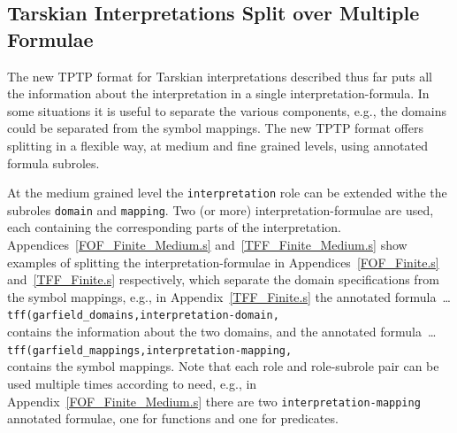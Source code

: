 \documentclass{easychair}
\newcommand{\smalltt}[1]{\small \texttt{#1}}
\begin{document}
\subsection{Tarskian Interpretations Split over Multiple Formulae}
\label{NewTarskianSplit}

The new TPTP format for Tarskian interpretations described thus far puts all the information 
about the interpretation in a single interpretation-formula.
In some situations it is useful to separate the various components, e.g., the domains could be
separated from the symbol mappings.
The new TPTP format offers splitting in a flexible way, at medium and fine grained levels, using 
annotated formula subroles.

At the medium grained level the {\tt interpretation} role can be extended withe the subroles
{\tt domain} and {\tt mapping}.
Two (or more) interpretation-formulae are used, each containing the corresponding parts of the 
interpretation.
Appendices~\ref{FOF_Finite_Medium.s} and~\ref{TFF_Finite_Medium.s} show examples of
splitting the interpretation-formulae in Appendices~\ref{FOF_Finite.s} and~\ref{TFF_Finite.s} 
respectively, which separate the domain specifications from the symbol mappings, e.g., in 
Appendix~\ref{TFF_Finite.s} the annotated formula~\ldots \\
\hspace*{1.0em}\smalltt{tff(garfield\_domains,interpretation-domain,} \\
contains the information about the two domains, and the annotated formula~\ldots \\
\hspace*{1.0em}\smalltt{tff(garfield\_mappings,interpretation-mapping,} \\
contains the symbol mappings.
Note that each role and role-subrole pair can be used multiple times according to need, e.g.,
in Appendix~\ref{FOF_Finite_Medium.s} there are two {\tt interpretation-mapping} annotated
formulae, one for functions and one for predicates.
\end{document}
